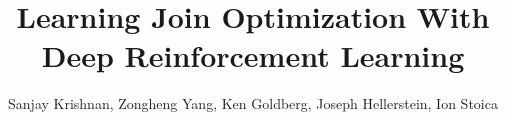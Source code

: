 \documentclass{vldb}
\newcommand{\sys}{\textsf{DQ}\xspace}
\begin{document}

\newcommand{\white}[1]{{\textcolor{white}{#1}\xspace}}
\newcommand{\blue}[1]{{\textcolor{blue}{{\bf #1}}\xspace}}
\newcommand{\orange}[1]{{\textcolor{orange}{{\bf #1}}\xspace}}
\newcommand{\pop}[1]{{\textcolor{pop}{{\textit{\textbf{#1}}}}\xspace}}
\newcommand{\red}[1]{\textcolor{red}{#1}}
\newcommand{\green}[1]{\textcolor{green}{#1}}
\newcommand{\gray}[1]{\textcolor{light-gray}{#1}}


\newcommand{\jmh}[1]{ {\color{red}jmh: #1}}


\newcommand{\specialcell}[2][c]{%
  \begin{tabular}[#1]{@{}c@{}}#2\end{tabular}}

\def\ojoin{\setbox0=\hbox{$\bowtie$}%
  \rule[-.02ex]{.25em}{.4pt}\llap{\rule[\ht0]{.25em}{.4pt}}}
\def\leftouterjoin{\mathbin{\ojoin\mkern-5.8mu\bowtie}}
\def\rightouterjoin{\mathbin{\bowtie\mkern-5.8mu\ojoin}}
\def\fullouterjoin{\mathbin{\ojoin\mkern-5.8mu\bowtie\mkern-5.8mu\ojoin}}


\pagestyle{plain}

%

\title{Learning Join Optimization With Deep Reinforcement Learning}

\author{ Sanjay Krishnan, Zongheng Yang, Ken Goldberg, Joseph Hellerstein, Ion Stoica  \\
 \\
\\
\affaddr{}
}

\maketitle
\end{document}
